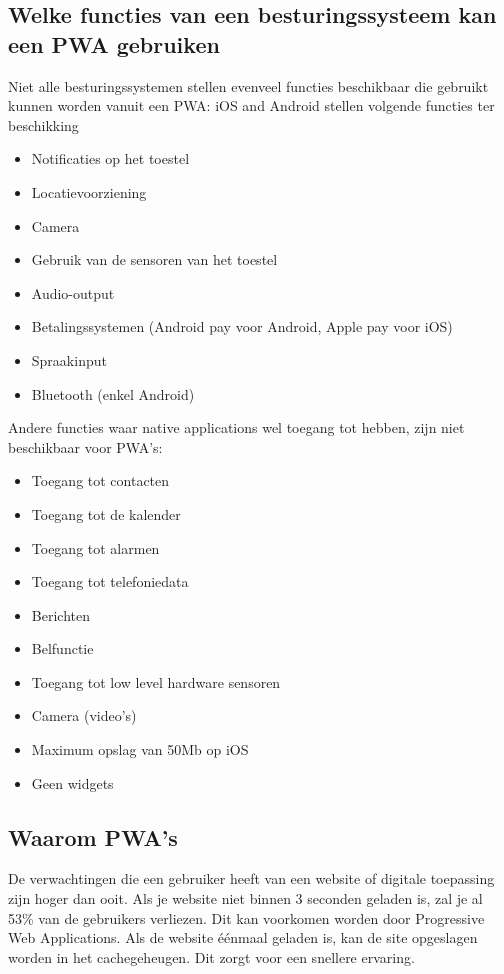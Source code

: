 \subsection{Welke functies van een besturingssysteem kan een PWA gebruiken}
Niet alle besturingssystemen stellen evenveel functies beschikbaar die gebruikt kunnen worden vanuit een PWA: iOS and Android stellen volgende functies ter beschikking
\begin{itemize}
    \item Notificaties op het toestel
    \item Locatievoorziening
    \item Camera
    \item Gebruik van de sensoren van het toestel
    \item Audio-output
    \item Betalingssystemen (Android pay voor Android, Apple pay voor iOS)
    \item Spraakinput
    \item Bluetooth (enkel Android)
\end{itemize}
Andere functies waar native applications wel toegang tot hebben, zijn niet beschikbaar voor PWA's:
\begin{itemize}
    \item Toegang tot contacten
    \item Toegang tot de kalender
    \item Toegang tot alarmen
    \item Toegang tot telefoniedata
    \item Berichten
    \item Belfunctie
    \item Toegang tot low level hardware sensoren
    \item Camera (video’s)
    \item Maximum opslag van 50Mb op iOS
    \item Geen widgets
\end{itemize}

\autocite{Malavolta2016}
\autocite{Destrebecq2018}

\subsection{Waarom PWA's}

De verwachtingen die een gebruiker heeft van een website of digitale toepassing zijn hoger dan ooit. Als je website niet binnen 3 seconden geladen is, zal je al 53\% van de gebruikers verliezen. Dit kan voorkomen worden door Progressive Web Applications. Als de website éénmaal geladen is, kan de site opgeslagen worden in het cachegeheugen. Dit zorgt voor een snellere ervaring.
\autocite{Google2017}

